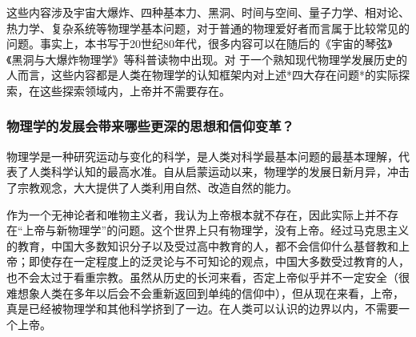 这些内容涉及宇宙大爆炸、四种基本力、黑洞、时间与空间、量子力学、相对论、热力学、复杂系统等物理学基本问题，对于普通的物理爱好者而言属于比较常见的问题。事实上，本书写于20世纪80年代，很多内容可以在随后的《宇宙的琴弦》《黑洞与大爆炸物理学》等科普读物中出现。对 于一个熟知现代物理学发展历史的人而言，这些内容都是人类在物理学的认知框架内对上述*四大存在问题*的实际探索，在这些探索领域内，上帝并不需要存在。

\subsubsection{物理学的发展会带来哪些更深的思想和信仰变革？}

物理学是一种研究运动与变化的科学，是人类对科学最基本问题的最基本理解，代表了人类科学认知的最高水准。自从启蒙运动以来，物理学的发展日新月异，冲击了宗教观念，大大提供了人类利用自然、改造自然的能力。

作为一个无神论者和唯物主义者，我认为上帝根本就不存在，因此实际上并不存在“上帝与新物理学”的问题。这个世界上只有物理学，没有上帝。经过马克思主义的教育，中国大多数知识分子以及受过高中教育的人，都不会信仰什么基督教和上帝；即使存在一定程度上的泛灵论与不可知论的观点，中国大多数受过教育的人，也不会太过于看重宗教。虽然从历史的长河来看，否定上帝似乎并不一定安全（很难想象人类在多年以后会不会重新返回到单纯的信仰中），但从现在来看，上帝，真是已经被物理学和其他科学挤到了一边。在人类可以认识的边界以内，不需要一个上帝。

